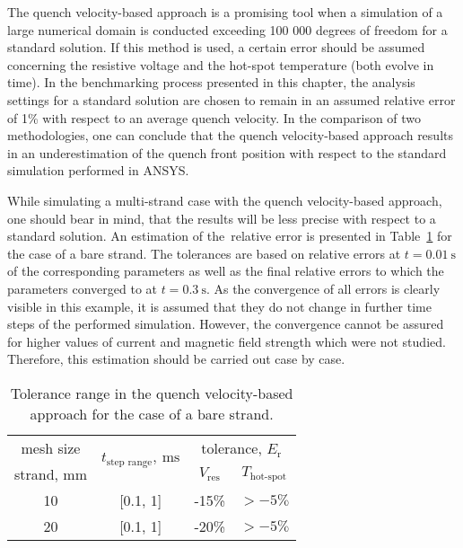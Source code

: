 
The quench velocity-based approach is a promising tool when a simulation of a large numerical domain is conducted exceeding 100 000 degrees of freedom for a standard solution. If this method is used, a certain error should be assumed concerning the resistive voltage and the hot-spot temperature (both evolve in time). In the benchmarking process presented in this chapter, the analysis settings for a standard solution are chosen to remain in an assumed relative error of 1\% with respect to an average quench velocity. In the comparison of two methodologies, one can conclude that the quench velocity-based approach results in an underestimation of the quench front position with respect to the standard simulation performed in ANSYS. 

While simulating a multi-strand case with the quench velocity-based approach, one should bear in mind, that the results will be less precise with respect to a standard solution. An estimation of the~relative error is presented in Table~\ref{table: 1d_qv_benchmarking_tolerance_range_without_insulation} for the case of a bare strand. The tolerances are based on relative errors at $t=0.01~\text{s}$ of the corresponding parameters as well as the final relative errors to which the parameters converged to at $t=0.3~\text{s}$. As the convergence of all errors is clearly visible in this example, it is assumed that they do not change in further time steps of the performed simulation. However, the convergence cannot be assured for higher values of current and magnetic field strength which were not studied. Therefore, this estimation should be carried out case by case.

 \begin{table}[H]
    \caption{Tolerance range in the quench velocity-based approach for the case of a bare strand.} 
    \vspace{-1.em} 
    \fontsize{10}{10}
    \selectfont 
    \renewcommand{\arraystretch}{1.5}
    \begin{center}
        \begin{tabular}{ | c | c | cc | }  
        
        \hline
        mesh size & \multirow{2}{*}{$t_\text{step range},~\text{ms}$} & \multicolumn{2}{c|}{tolerance, $E_\text{r}$} \\
        
        strand, mm &  & $V_\text{res}$ & $T_\text{hot-spot}$ \\
        \hline
        10 & [0.1, 1] & -15\% & $>-5\%$ \\
        20 & [0.1, 1] & -20\% & $>-5\%$ \\
        \hline 
        \end{tabular}
    \end{center}  
     \label{table: 1d_qv_benchmarking_tolerance_range_without_insulation} 
 \end{table}
 
